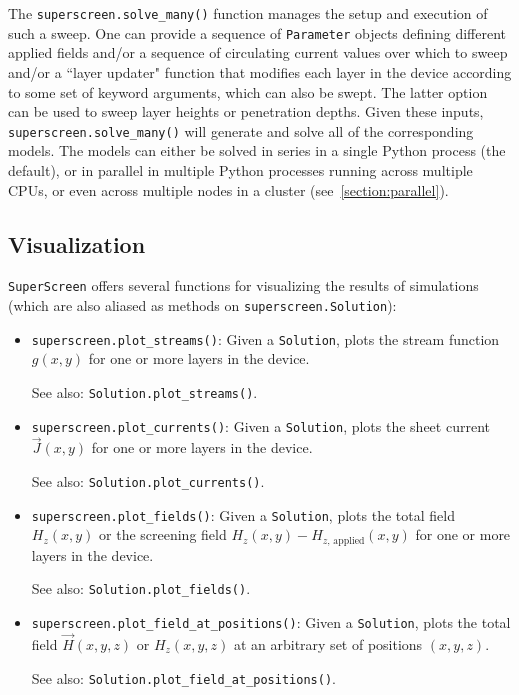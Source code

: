 \documentclass[final,3p,times]{elsarticle}
\newcommand{\inline}[1]{\texttt{#1}\xspace}
\newcommand{\SuperScreen}{\inline{SuperScreen}}
\begin{document}
The \inline{superscreen.solve_many()} function manages the setup and execution of such a sweep. One can provide a sequence of \inline{Parameter} objects defining different applied fields and/or a sequence of circulating current values over which to sweep and/or a ``layer updater" function that modifies each layer in the device according to some set of keyword arguments, which can also be swept. The latter option can be used to sweep layer heights or penetration depths. Given these inputs, \inline{superscreen.solve_many()} will generate and solve all of the corresponding models. The models can either be solved in series in a single Python process (the default), or in parallel in multiple Python processes running across multiple CPUs, or even across multiple nodes in a cluster (see~\ref{section:parallel}).

\subsection{Visualization}
\label{section:overview:visualization}

\SuperScreen offers several functions for visualizing the results of simulations (which are also aliased as methods on \inline{superscreen.Solution}):

\begin{itemize}
    \item{
    \inline{superscreen.plot_streams()}: Given a \inline{Solution}, plots the stream function $g(x, y)$ for one or more layers in the device.
    
    See also: \inline{Solution.plot_streams()}.
    }
    \item{
    \inline{superscreen.plot_currents()}: Given a \inline{Solution}, plots the sheet current $\vec{J}(x, y)$ for one or more layers in the device.
    
    See also: \inline{Solution.plot_currents()}.
    }
    \item{
    \inline{superscreen.plot_fields()}: Given a \inline{Solution}, plots the total field $H_z(x, y)$ or the screening field $H_z(x, y) - H_{z,\,\mathrm{applied}}(x, y)$ for one or more layers in the device.
    
    See also: \inline{Solution.plot_fields()}.
    }
    \item{
    \inline{superscreen.plot_field_at_positions()}: Given a \inline{Solution}, plots the total field $\vec{H}(x, y, z)$ or $H_z(x, y, z)$ at an arbitrary set of positions $(x, y, z)$.
    
    See also: \inline{Solution.plot_field_at_positions()}.
    }
\end{itemize}
\end{document}
